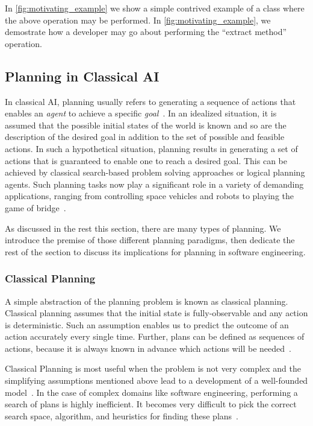 \documentclass[10pt,journal,compsoc]{IEEEtran}
\begin{document}
In \ref{fig:motivating_example}\protect{} we show a simple contrived example of a class where the above operation may be performed. In \ref{fig:motivating_example}\protect{}, we demostrate how a developer may go about performing the ``extract method'' operation.

\subsection{Planning in Classical AI}

In classical AI, planning usually refers to generating a sequence of actions that enables an \textit{agent} to achieve a specific \textit{goal}~\cite{norvig}. In an idealized situation, it is assumed that the possible initial states of the world is known and so are the description of the desired goal in addition to the set of possible and feasible actions. In such a hypothetical situation, planning results in generating a set of actions that is guaranteed to enable one to reach a desired goal. This can be achieved by classical search-based problem solving  approaches or logical planning agents. Such planning tasks now play a significant role in a variety of demanding applications, ranging from controlling space vehicles and robots to playing the game of bridge~\cite{ghallab04}. 

As discussed in the rest this section, there are many  types of planning. We introduce the premise of those different planning paradigms, then dedicate the rest of the section to discuss its implications for planning in software engineering.

\subsubsection{Classical Planning}
A simple abstraction of the planning problem is known as classical planning. Classical planning assumes that the initial state is fully-observable and any action is deterministic. Such an assumption enables us to predict the outcome of an action accurately every single time. Further, plans can be defined as sequences of actions, because it is always known in advance which actions will be needed~\cite{strips}. 

Classical Planning is most useful when the problem is not very complex and the simplifying assumptions mentioned above lead to a development of a well-founded model~\cite{wooldridge95}.  In the case of complex domains like software engineering, performing a search of plans is highly inefficient. It becomes very difficult to pick the correct search space, algorithm, and heuristics for finding these plans~\cite{ghallab04}.
\end{document}
